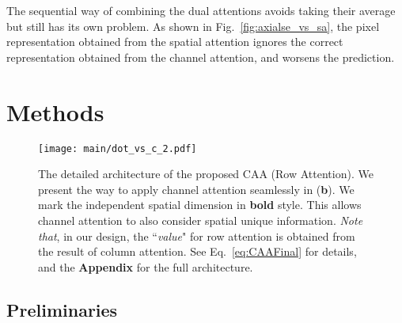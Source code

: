 \documentclass[letterpaper]{article} \usepackage{aaai22}  \usepackage{times}  \usepackage{helvet}  \usepackage{courier}  \usepackage[hyphens]{url}  \usepackage{graphicx} \urlstyle{rm} \def\UrlFont{\rm}  \usepackage{natbib}  \usepackage{caption} \DeclareCaptionStyle{ruled}{labelfont=normalfont,labelsep=colon,strut=off} \frenchspacing  \setlength{\pdfpagewidth}{8.5in}  \setlength{\pdfpageheight}{11in}  \usepackage{algorithm}
\begin{document}
The sequential way of combining the dual attentions avoids taking their average but still has its own problem. 
As shown in Fig.~\ref{fig:axialse_vs_sa}, the pixel representation obtained from the spatial attention ignores the correct representation obtained from the channel attention, and worsens the prediction.




\section{Methods} \label {sectMethods}

\begin{figure*}[t]
	\centering
	\texttt{[image: main/dot\_vs\_c\_2.pdf]}
	\caption{The detailed architecture of the proposed CAA (Row Attention). We present the way to apply channel attention seamlessly in (\textbf{b}). We mark the independent spatial dimension in \textbf{bold} style. This allows channel attention to also consider spatial unique information. \textit{Note that}, in our design, the ``\textit{value}" for row attention is obtained from the result of column attention. See Eq.~\ref{eq:CAAFinal} for details, and the \textbf{Appendix} for the full architecture.
	}
	\label{figOverall}
\end{figure*}


\subsection {Preliminaries}
\end{document}
